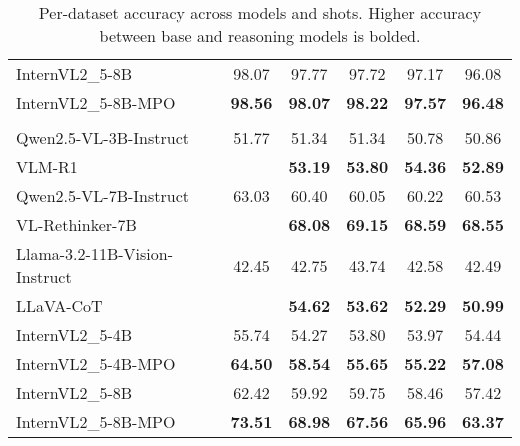 \begin{table}[!h]
\begin{tabular}{lccccc}
\midrule
{InternVL2\_5-8B} & 98.07 & 97.77 & 97.72 & 97.17 & 96.08 \\
{InternVL2\_5-8B-MPO} & \textbf{98.56} & \textbf{98.07} & \textbf{98.22} & \textbf{97.57} & \textbf{96.48} \\
\midrule
\rowcolor{gray!20} \multicolumn{6}{c}{\textbf{M3CoT}} \\
\midrule
{Qwen2.5-VL-3B-Instruct} & 51.77 & 51.34 & 51.34 & 50.78 & 50.86 \\
{VLM-R1} &  & \textbf{53.19} & \textbf{53.80} & \textbf{54.36} & \textbf{52.89} \\
\midrule
{Qwen2.5-VL-7B-Instruct} & 63.03 & 60.40 & 60.05 & 60.22 & 60.53 \\
{VL-Rethinker-7B} &  & \textbf{68.08} & \textbf{69.15} & \textbf{68.59} & \textbf{68.55} \\
\midrule
{Llama-3.2-11B-Vision-Instruct} & 42.45 & 42.75 & 43.74 & 42.58 & 42.49 \\
{LLaVA-CoT} &  & \textbf{54.62} & \textbf{53.62} & \textbf{52.29} & \textbf{50.99} \\
\midrule
{InternVL2\_5-4B} & 55.74 & 54.27 & 53.80 & 53.97 & 54.44 \\
{InternVL2\_5-4B-MPO} & \textbf{64.50} & \textbf{58.54} & \textbf{55.65} & \textbf{55.22} & \textbf{57.08} \\
\midrule
{InternVL2\_5-8B} & 62.42 & 59.92 & 59.75 & 58.46 & 57.42 \\
{InternVL2\_5-8B-MPO} & \textbf{73.51} & \textbf{68.98} & \textbf{67.56} & \textbf{65.96} & \textbf{63.37} \\
\bottomrule
\end{tabular}
\caption{Per-dataset accuracy across models and shots. Higher accuracy between base and reasoning models is bolded.}
\label{tab:per_dataset_bolded}
\end{table}